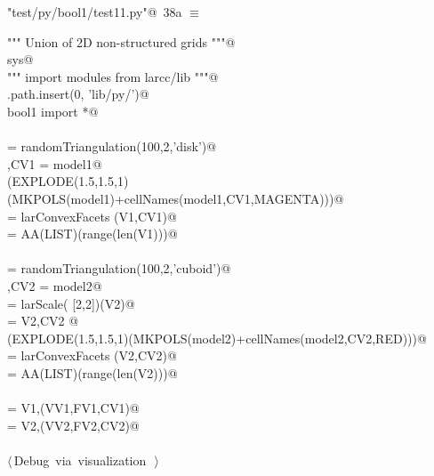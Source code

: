 \documentclass[11pt,oneside]{article}	%
\begin{document}
\begin{flushleft} \small
\begin{minipage}{\linewidth} \label{scrap49}
\protect{}\verb@"test/py/bool1/test11.py"@\nobreak\ {\footnotesize 38a }$\equiv$
\vspace{-1ex}
\begin{list}{}{} \item
\mbox{}\verb@""" Union of 2D non-structured grids """@\\
\mbox{}\verb@import sys@\\
\mbox{}\verb@""" import modules from larcc/lib """@\\
\mbox{}\verb@sys.path.insert(0, 'lib/py/')@\\
\mbox{}\verb@from bool1 import *@\\
\mbox{}\verb@@\\
\mbox{} = randomTriangulation(100,2,'disk')@\\
\mbox{},CV1 = model1@\\
\mbox{}\verb@VIEW(EXPLODE(1.5,1.5,1)(MKPOLS(model1)+cellNames(model1,CV1,MAGENTA)))@\\
\mbox{} = larConvexFacets (V1,CV1)@\\
\mbox{} = AA(LIST)(range(len(V1)))@\\
\mbox{}\verb@@\\
\mbox{} = randomTriangulation(100,2,'cuboid')@\\
\mbox{},CV2 = model2@\\
\mbox{} = larScale( [2,2])(V2)@\\
\mbox{} = V2,CV2 @\\
\mbox{}\verb@VIEW(EXPLODE(1.5,1.5,1)(MKPOLS(model2)+cellNames(model2,CV2,RED)))@\\
\mbox{} = larConvexFacets (V2,CV2)@\\
\mbox{} = AA(LIST)(range(len(V2)))@\\
\mbox{}\verb@@\\
\mbox{} = V1,(VV1,FV1,CV1)@\\
\mbox{} = V2,(VV2,FV2,CV2)@\\
\mbox{}\verb@@\\
\mbox{}\verb@@\hbox{$\langle\,$Debug via visualization\nobreak\ {\footnotesize {}}$\,\rangle$}\verb@@\\
\mbox{}\verb@@{\NWsep}
\end{list}
\vspace{-2ex}
\end{minipage}\\[4ex]
\end{flushleft}
\end{document}
